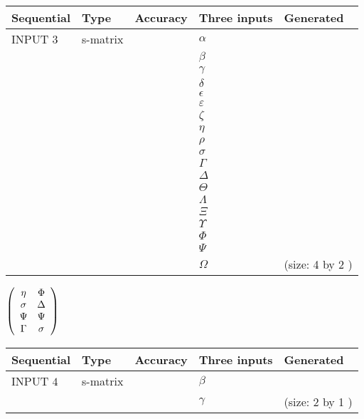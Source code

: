\documentclass[12pt]{article}
\begin{document}
  
\noindent\begin{tabular}{|l|l|l|l|l|}
\hline
 Sequential & Type & Accuracy & Three inputs & Generated \\ 
\hline
 
 
  INPUT $            3 $ & s-matrix & & 
 $  \alpha $ & 
  \\
  & & & 
 $  \beta $ & 
  \\
  & & & 
 $  \gamma $ & 
  \\
  & & & 
 $  \delta $ & 
  \\
  & & & 
 $  \epsilon $ & 
  \\
  & & & 
 $  \varepsilon $ & 
  \\
  & & & 
 $                     \zeta $ & 
  \\
  & & & 
 $  \eta $ & 
  \\
  & & & 
 $  \rho $ & 
  \\
  & & & 
 $  \sigma $ & 
  \\
  & & & 
 $  \Gamma $ & 
  \\
  & & & 
 $  \Delta $ & 
  \\
  & & & 
 $  \Theta $ & 
  \\
  & & & 
 $  \Lambda $ & 
  \\
  & & & 
 $                     \Xi $ & 
  \\
  & & & 
 $  \Upsilon $ & 
  \\
  & & & 
 $  \Phi $ & 
  \\
  & & & 
 $  \Psi $ & 
  \\
  & & & 
 $  \Omega $ & 
  (size:            4  by            2 )
 \\  \hline  
 \end{tabular}
   
   
 $  \left( \begin{array}
 {
 c
 c
 }
 \eta & 
 \Phi \\ 
 \sigma & 
 \Delta \\ 
 \Psi & 
 \Psi \\ 
 \Gamma & 
 \sigma
 \end{array} \right) $ 
  
  
\noindent\begin{tabular}{|l|l|l|l|l|}
\hline
 Sequential & Type & Accuracy & Three inputs & Generated \\ 
\hline
 
 
  INPUT $            4 $ & s-matrix & & 
 $  \beta $ & 
  \\
  & & & 
 $  \gamma $ & 
  (size:            2  by            1 )
 \\  \hline  
 \end{tabular}
   
\end{document}
